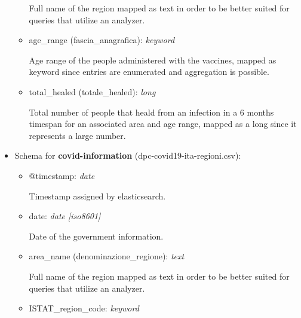 \documentclass[12pt, a4paper]{article}
\begin{document}
\begin{itemize}
\begin{itemize}
        \begin{footnotesize}
          Full name of the region mapped as text in order to be better suited for queries
          that utilize an analyzer.
        \end{footnotesize}
      \item age\_range (fascia\_anagrafica): \emph{keyword} \\
        \begin{footnotesize}
          Age range of the people administered with the vaccines, mapped as keyword since
          entries are enumerated and aggregation is possible.
        \end{footnotesize}
      \item total\_healed (totale\_healed): \emph{long} \\
        \begin{footnotesize}
          Total number of people that heald from an infection in a 6 months timespan for
          an associated area and age range, mapped as a long since it represents a large 
          number.      
        \end{footnotesize}
    \end{itemize}
  \item Schema for \textbf{covid-information} (dpc-covid19-ita-regioni.csv):
    \begin{itemize}
      \item @timestamp: \emph{date} \\
        \begin{footnotesize}
          Timestamp assigned by elasticsearch.
        \end{footnotesize}
      \item date: \emph{date [iso8601]} \\
        \begin{footnotesize}
          Date of the government information.
        \end{footnotesize}
      \item area\_name (denominazione\_regione): \emph{text} \\
        \begin{footnotesize}
          Full name of the region mapped as text in order to be better suited for queries
          that utilize an analyzer.
        \end{footnotesize}
      \item ISTAT\_region\_code: \emph{keyword} \\
        \begin{footnotesize}

\end{footnotesize}
\end{itemize}
\end{itemize}
\end{document}
